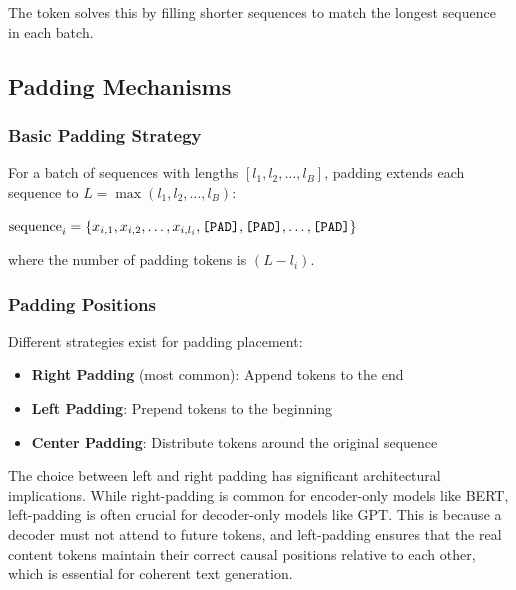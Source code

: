 The \pad{} token solves this by filling shorter sequences to match the longest sequence in each batch.

\subsection{Padding Mechanisms}

\subsubsection{Basic Padding Strategy}
For a batch of sequences with lengths $[l_1, l_2, \ldots, l_B]$, padding extends each sequence to $L = \max(l_1, l_2, \ldots, l_B)$:

$\text{sequence}_i = \{x_{i,1}, x_{i,2}, \ldots, x_{i,l_i}, \texttt{[PAD]}{}, \texttt{[PAD]}{}, \ldots, \texttt{[PAD]}{}\}$

where the number of padding tokens is $(L - l_i)$.

\subsubsection{Padding Positions}
Different strategies exist for padding placement:

\begin{itemize}
\item \textbf{Right Padding} (most common): Append \pad{} tokens to the end
\item \textbf{Left Padding}: Prepend \pad{} tokens to the beginning  
\item \textbf{Center Padding}: Distribute \pad{} tokens around the original sequence
\end{itemize}

The choice between left and right padding has significant architectural implications. While right-padding is common for encoder-only models like BERT, left-padding is often crucial for decoder-only models like GPT. This is because a decoder must not attend to future tokens, and left-padding ensures that the real content tokens maintain their correct causal positions relative to each other, which is essential for coherent text generation.

